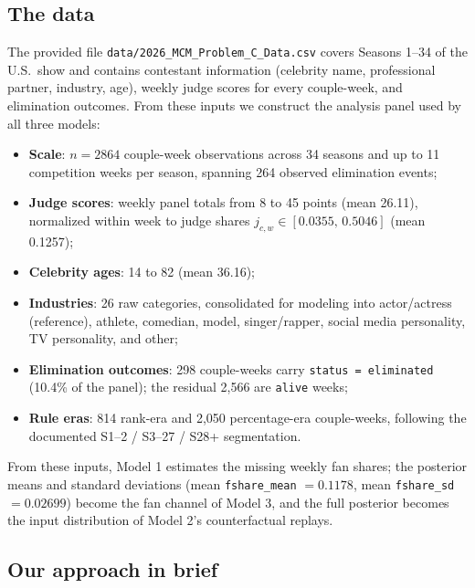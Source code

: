 \documentclass[11pt]{article}
\begin{document}
\subsection{The data}

The provided file \texttt{data/2026\_MCM\_Problem\_C\_Data.csv} covers Seasons 1--34 of the
U.S.\ show and contains contestant information (celebrity name, professional partner,
industry, age), weekly judge scores for every couple-week, and elimination outcomes.
From these inputs we construct the analysis panel used by all three models:
\begin{itemize}
\item \textbf{Scale}: $n = 2864$ couple-week observations across 34 seasons and up to 11
competition weeks per season, spanning 264 observed elimination events;
\item \textbf{Judge scores}: weekly panel totals from 8 to 45 points (mean 26.11),
normalized within week to judge shares $j_{c,w} \in [0.0355,\, 0.5046]$ (mean 0.1257);
\item \textbf{Celebrity ages}: 14 to 82 (mean 36.16);
\item \textbf{Industries}: 26 raw categories, consolidated for modeling into
actor/actress (reference), athlete, comedian, model, singer/rapper, social media
personality, TV personality, and other;
\item \textbf{Elimination outcomes}: 298 couple-weeks carry \texttt{status = eliminated}
(10.4\% of the panel); the residual 2{,}566 are \texttt{alive} weeks;
\item \textbf{Rule eras}: 814 rank-era and 2{,}050 percentage-era couple-weeks, following
the documented S1--2 / S3--27 / S28+ segmentation.
\end{itemize}

From these inputs, Model 1 estimates the missing weekly fan shares; the posterior means
and standard deviations (mean \texttt{fshare\_mean} $= 0.1178$, mean
\texttt{fshare\_sd} $= 0.02699$) become the fan channel of Model 3, and the full
posterior becomes the input distribution of Model 2's counterfactual replays.

\subsection{Our approach in brief}
\end{document}
